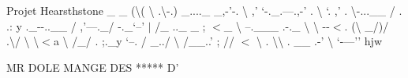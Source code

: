 Projet Hearsthstone \-\_\- \-\_\- (\textbackslash{}( \textbackslash{} {\ttfamily .\textbackslash{}-\/.) \-\_\-....\-\_\- \-\_\-,-\/'}-\/. \textbackslash{} ,' `-\/.\-\_\-.---.,-\/' . \textbackslash{} `. ,' {\ttfamily . \textbackslash{}}-\/...\-\_\-\-\_\- / . .\-: y {\ttfamily .\-\_\-}{\ttfamily -\/-\/..\-\_\-\-\_\- / ,'}---.\-\_\-/ {\ttfamily -\/.\-\_\-}`--' $\vert$ /\-\_\- {\ttfamily ..\-\_\- \-\_\- ; $<$\-\_\- \textbackslash{} }--.\-\_\-\-\_\-\-\_\- {\ttfamily .}-\/.\-\_\- \textbackslash{} \textbackslash{} {\ttfamily -\/-\/$<$}. (\textbackslash{} \-\_\-/)/ {\ttfamily .\textbackslash{}/ \textbackslash{} \textbackslash{}}$<$a \textbackslash{} /\-\_\-/ {\ttfamily . ;}.\-\_\-y `--. / \-\_\-../ \textbackslash{} /\-\_\-\-\_\-..' ; // $<$ \textbackslash{} {\ttfamily . \textbackslash{}\textbackslash{} }.  \-\_\-\-\_\- {\ttfamily .}-\/' \textbackslash{} `-\/---'' hjw

\begin{DoxyVerb}                                   MR DOLE MANGE DES ***** D'\end{DoxyVerb}
 